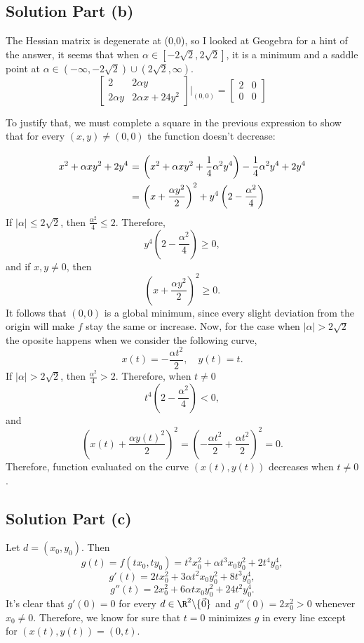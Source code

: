 \subsection*{Solution Part (b)}

The Hessian matrix is degenerate at (0,0), so I looked at Geogebra for a hint of the answer, it seems that when $\alpha \in [-2\sqrt{2}, 2\sqrt{2}]$, it is a minimum and a saddle point at $ \alpha \in (-\infty, -2\sqrt{2}) \cup (2\sqrt{2}, \infty)$.
\[ \left[ \begin{matrix}
    2 & 2\alpha y\\
    2\alpha y & 2\alpha x + 24 y^2
\end{matrix} \right]\Big|_{(0,0)} = \left[ \begin{matrix}
    2 & 0\\
    0 & 0
\end{matrix} \right] \]

To justify that, we must complete a square in the previous expression to show that for every $(x,y) \neq (0,0)$ the function doesn't decrease:
\[ \everymath{\displaystyle}
\arraycolsep=1.8pt\def\arraystretch{2.5}
\begin{array}{rcl}
    x^2 + \alpha xy^2 + 2 y^4 & = & \left( x^2 + \alpha xy^2 + \frac{1}{4}\alpha^2 y^4 \right) - \frac{1}{4}\alpha^2 y^4 + 2y^4\\
    & = & \left( x+ \frac{\alpha y^2}{2} \right)^2 + y^4 \left( 2- \frac{\alpha^2}{4} \right)
\end{array} \]
If $|\alpha| \leq 2\sqrt{2}$, then $\frac{\alpha^2}{4} \leq 2$. Therefore,
\[ y^4 \left( 2- \frac{\alpha^2}{4} \right) \geq 0, \]
and if $x,y \neq 0$, then
\[ \left( x+ \frac{\alpha y^2}{2} \right)^2 \geq 0. \]
It follows that $(0,0)$ is a global minimum, since every slight deviation from the origin will make $f$ stay the same or increase. Now, for the case when $|\alpha| > 2 \sqrt{2}$ the oposite happens when we consider the following curve,
\[ x(t) = -\frac{\alpha t^2}{2},\hspace{1em} y(t) = t. \]
If $|\alpha| > 2\sqrt{2}$, then $\frac{\alpha^2}{4} > 2$. Therefore, when $t \neq 0$
\[ t^4 \left( 2- \frac{\alpha^2}{4} \right) < 0, \]
and
\[ \left( x(t) + \frac{\alpha y(t)^2}{2} \right)^2 = \left( -\frac{\alpha t^2}{2} + \frac{\alpha t^2}{2} \right)^2 = 0. \]
Therefore, function evaluated on the curve $(x(t), y(t))$ decreases when $t \neq 0$.
\subsection*{Solution Part (c)}

Let $d = (x_0,y_0)$. Then
\[ g(t) = f(tx_0, t y_0) = t^2 x_0^2 + \alpha t^3 x_0 y_0^2 + 2 t^4 y_0^4, \]
\[ g'(t) = 2t x_0^2 + 3\alpha t^2 x_0 y_0^2 + 8 t^3 y_0^4, \]
\[ g''(t) = 2x_0^2 + 6 \alpha t x_0 y_0^2 + 24 t^2 y_0^4. \]
It's clear that $g'(0) = 0$ for every $d \in \R^2\backslash\{\vec{0}\}$ and $g''(0) = 2 x_0^2 > 0$ whenever $x_0 \neq 0$. Therefore, we know for sure that $t = 0$ minimizes $g$ in every line except for $(x(t), y(t)) = (0,t)$.

